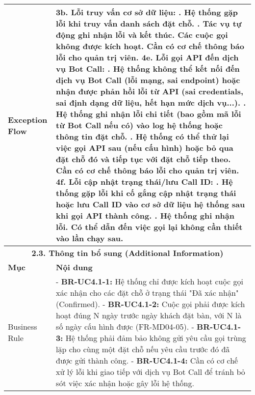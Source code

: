 \begin{longtable}{|m{4cm}|p{11cm}|}
Exception Flow & \textbf{3b. Lỗi truy vấn cơ sở dữ liệu:} \newline    1. Hệ thống gặp lỗi khi truy vấn danh sách đặt chỗ. \newline    2. Tác vụ tự động ghi nhận lỗi và kết thúc. Các cuộc gọi không được kích hoạt. Cần có cơ chế thông báo lỗi cho quản trị viên. \newline \textbf{4e. Lỗi gọi API đến dịch vụ Bot Call:} \newline    1. Hệ thống không thể kết nối đến dịch vụ Bot Call (lỗi mạng, sai endpoint) hoặc nhận được phản hồi lỗi từ API (sai credentials, sai định dạng dữ liệu, hết hạn mức dịch vụ...). \newline    2. Hệ thống ghi nhận lỗi chi tiết (bao gồm mã lỗi từ Bot Call nếu có) vào log hệ thống hoặc thông tin đặt chỗ. \newline    3. Hệ thống có thể thử lại việc gọi API sau (nếu cấu hình) hoặc bỏ qua đặt chỗ đó và tiếp tục với đặt chỗ tiếp theo. Cần có cơ chế thông báo lỗi cho quản trị viên. \newline \textbf{4f. Lỗi cập nhật trạng thái/lưu Call ID:} \newline    1. Hệ thống gặp lỗi khi cố gắng cập nhật trạng thái hoặc lưu Call ID vào cơ sở dữ liệu hệ thống sau khi gọi API thành công. \newline    2. Hệ thống ghi nhận lỗi. Có thể dẫn đến việc gọi lại không cần thiết vào lần chạy sau. \\
\hline
\multicolumn{2}{|c|}{\textbf{2.3. Thông tin bổ sung (Additional Information)}} \\
\hline
\textbf{Mục} & \textbf{Nội dung} \\
\hline
Business Rule & - \textbf{BR-UC4.1-1:} Hệ thống chỉ được kích hoạt cuộc gọi xác nhận cho các đặt chỗ ở trạng thái "Đã xác nhận" (Confirmed). \newline - \textbf{BR-UC4.1-2:} Cuộc gọi phải được kích hoạt đúng N ngày trước ngày khách đặt bàn, với N là số ngày cấu hình được (FR-MD04-05). \newline - \textbf{BR-UC4.1-3:} Hệ thống phải đảm bảo không gửi yêu cầu gọi trùng lặp cho cùng một đặt chỗ nếu yêu cầu trước đó đã được gửi thành công. \newline - \textbf{BR-UC4.1-4:} Cần có cơ chế xử lý lỗi khi giao tiếp với dịch vụ Bot Call để tránh bỏ sót việc xác nhận hoặc gây lỗi hệ thống. \\
\hline

\end{longtable}
